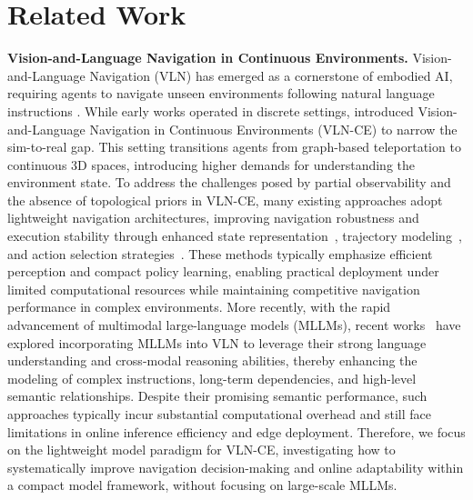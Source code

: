 \documentclass{article}
\theoremstyle{plain}
\theoremstyle{definition}
\theoremstyle{remark}
\begin{document}
\section{Related Work} \label{sec:rw}   
\noindent\textbf{Vision-and-Language Navigation in Continuous Environments.}
Vision-and-Language Navigation (VLN) has emerged as a cornerstone of embodied AI, requiring agents to navigate unseen environments following natural language instructions \citep{anderson2018vision,qi2020reverie,banerjee2021robotslang,Chen_2022_DUET,an2023bevbert,qiao2023hop,song2024towards, guo2026hist}.
While early works operated in discrete settings, \citet{krantz2020beyond} introduced Vision-and-Language Navigation in Continuous Environments (VLN-CE) to narrow the sim-to-real gap. This setting transitions agents from graph-based teleportation to continuous 3D spaces, introducing higher demands for understanding the environment state.
To address the challenges posed by partial observability and the absence of topological priors in VLN-CE, many existing approaches adopt lightweight navigation architectures, improving navigation robustness and execution stability through enhanced state representation~\citep{wang2025g3d,huang2025unemo}, trajectory modeling~\citep{an2024etpnav,wang2023gridmm}, and action selection strategies~\citep{wang2024sim,wang2024lookahead}.
These methods typically emphasize efficient perception and compact policy learning, enabling practical deployment under limited computational resources while maintaining competitive navigation performance in complex environments.
More recently, with the rapid advancement of multimodal large-language models (MLLMs), recent works~\citep{lin2025navcot, zhang2025activevln, zhang2024navid, gao2025building, yuan2025evoagent} have explored incorporating MLLMs into VLN to leverage their strong language understanding and cross-modal reasoning abilities, thereby enhancing the modeling of complex instructions, long-term dependencies, and high-level semantic relationships. 
Despite their promising semantic performance, such approaches typically incur substantial computational overhead and still face limitations in online inference efficiency and edge deployment. Therefore, we focus on the lightweight model paradigm for VLN-CE, investigating how to systematically improve navigation decision-making and online adaptability within a compact model framework, without focusing on large-scale MLLMs.
\end{document}
